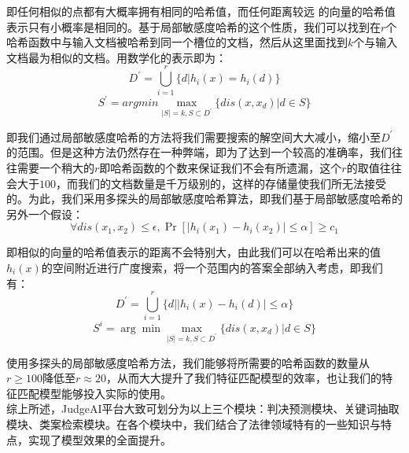 即任何相似的点都有大概率拥有相同的哈希值，而任何距离较远 的向量的哈希值表示只有小概率是相同的。基于局部敏感度哈希的这个性质，我们可以找到在$r$个哈希函数中与输入文档被哈希到同一个槽位的文档，然后从这里面找到$k$个与输入文档最为相似的文档。用数学化的表示即为：
	\begin{equation}
		D^{'}=\bigcup_{i=1}^{r}\{d|h_{i}(x)=h_{i}(d)\} 
	\end{equation}
	\begin{equation}
		S^{'} = argmin \max_{|S|=k,S \subset D^{'}}\{dis(x,x_d)|d \in S\}
	\end{equation}

即我们通过局部敏感度哈希的方法将我们需要搜索的解空间大大减小，缩小至$D^{'}$的范围。但是这种方法仍然存在一种弊端，即为了达到一个较高的准确率，我们往往需要一个稍大的$ r $即哈希函数的个数来保证我们不会有所遗漏，这个$r$的取值往往会大于$100$，而我们的文档数量是千万级别的，这样的存储量使我们所无法接受的。为此，我们采用多探头的局部敏感度哈希算法，即我们基于局部敏感度哈希的另外一个假设：
	\begin{equation}
		\forall dis(x_{1},x_{2}) \leq \epsilon, \Pr⁡[|h_i(x_1 )-h_i(x_2 )| \leq \alpha ]\geq c_1
	\end{equation}
	
即相似的向量的哈希值表示的距离不会特别大，由此我们可以在哈希出来的值$h_i(x)$的空间附近进行广度搜索，将一个范围内的答案全部纳入考虑，即我们有：
	\begin{equation}
		D^{'}= \bigcup_{i=1}^{r}\{d| |h_i(x)-h_i(d)|\leq \alpha\} 
	\end{equation}
	\begin{equation}
		S^{i} = \arg\min\max_{|S| = k, S \subset D^{'}}\{dis(x, x_{d}) | d \in S\} 
	\end{equation}

使用多探头的局部敏感度哈希方法，我们能够将所需要的哈希函数的数量从$r \geq 100$降低至$r \approx 20$，从而大大提升了我们特征匹配模型的效率，也让我们的特征匹配模型能够投入实际的使用。
\\

综上所述，JudgeAI平台大致可划分为以上三个模块：判决预测模块、关键词抽取模块、类案检索模块。在各个模块中，我们结合了法律领域特有的一些知识与特点，实现了模型效果的全面提升。



